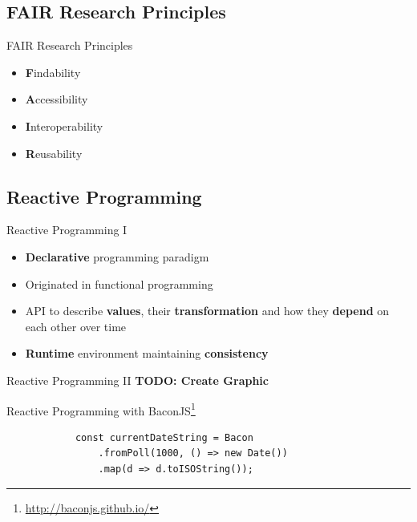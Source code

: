 \documentclass{beamer}
\begin{document}
\subsection*{FAIR Research Principles}
\begin{frame}{FAIR Research Principles \cite{wilkinson:2016} \cite{2019arXiv190805986H}}
	\begin{itemize}
		\item \textbf{F}indability\bigskip
		\item \textbf{A}ccessibility\bigskip
		\item \textbf{I}nteroperability\bigskip
		\item \textbf{R}eusability
	\end{itemize}
\end{frame}

\subsection*{Reactive Programming}
\begin{frame}{Reactive Programming I}
	\begin{itemize}
		\item \textbf{Declarative} programming paradigm\bigskip
		\item Originated in functional programming\bigskip
		\item API to describe \textbf{values}, their \textbf{transformation} and how they \textbf{depend} on each other over time\bigskip
		\item \textbf{Runtime} environment maintaining \textbf{consistency}
	\end{itemize}
\end{frame}

\begin{frame}[fragile=singleslide]{Reactive Programming II}
	\textbf{TODO: Create Graphic}

	\begin{block}{Reactive Programming with BaconJS\footnote{\url{http://baconjs.github.io/}}}
		\begin{verbatim}
			const currentDateString = Bacon
				.fromPoll(1000, () => new Date())
				.map(d => d.toISOString());
		\end{verbatim}
	\end{block}

\end{frame}
\end{document}
